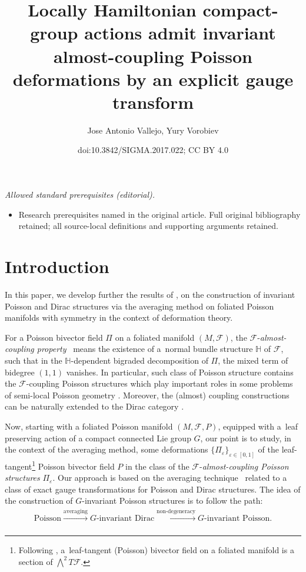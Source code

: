 \documentclass[10pt,a4paper]{amsart}
\title{Locally Hamiltonian compact-group actions admit invariant almost-coupling Poisson deformations by an explicit gauge transform}
\author{Jose Antonio Vallejo, Yury Vorobiev}
\date{doi:10.3842/SIGMA.2017.022; CC BY 4.0}
\numberwithin{equation}{section}
\begin{document}
\maketitle
\noindent\textit{Allowed standard prerequisites (editorial).}\begin{itemize}
\item Research prerequisites named in the original article. Full original bibliography retained; all source-local definitions and supporting arguments retained.
\end{itemize}\medskip
\section{Introduction}

In this paper, we develop further the results of \cite{JVYV-14,Vor-08}, on the construction of invariant Poisson and Dirac structures via the averaging method on foliated Poisson manifolds with symmetry in the context of deformation theory.

For a Poisson bivector f\/ield $\Pi$ on a foliated manifold $(M,\mathcal{F})$, the $\mathcal{F}$-\textit{almost-coupling proper\-ty}~\cite{Va-04} means the existence of a~normal bundle structure $\mathbb{H}$ of $\mathcal{F}$, such that in the $\mathbb{H}$-dependent bigraded decomposition of $\Pi$, the mixed term of bidegree $(1,1)$ vanishes. In particular, such class of Poisson structure contains the $\mathcal{F}$-coupling Poisson structures which play important roles in some problems of semi-local Poisson geometry \cite{CrFe,CrMa-12,Va-04, Vo-01}. Moreover, the (almost) coupling constructions can be naturally extended to the Dirac category \cite{BrF, Va-06,Wa}.

Now, starting with a foliated Poisson manifold $(M,\mathcal{F},P)$, equipped with a~leaf preserving action of a compact connected Lie group $G$, our point is to study, in the context of the averaging method, some deformations $\{\Pi_{\varepsilon }\}_{\varepsilon\in [0,1]}$ of the leaf-tangent\footnote{Following \cite{Va-06}, a~leaf-tangent (Poisson) bivector f\/ield on a foliated manifold is a section of $\bigwedge^2 T\mathcal{F}$.} Poisson bivector f\/ield $P$ in the class of the $\mathcal{F}$-\textit{almost-coupling Poisson structures} $\Pi_{\varepsilon}$. Our approach is based on the averaging technique~\cite{JVYV-14} related to a class of exact gauge transformations for Poisson and Dirac structures. The idea of the construction of $G$-invariant Poisson structures is to follow the path:
\begin{gather*}
\text{Poisson}\xrightarrow[]{\text{averaging}}G\text{-invariant Dirac}\xrightarrow[]{\text{non-degeneracy}}G\text{-invariant Poisson}.
\end{gather*}
\end{document}
